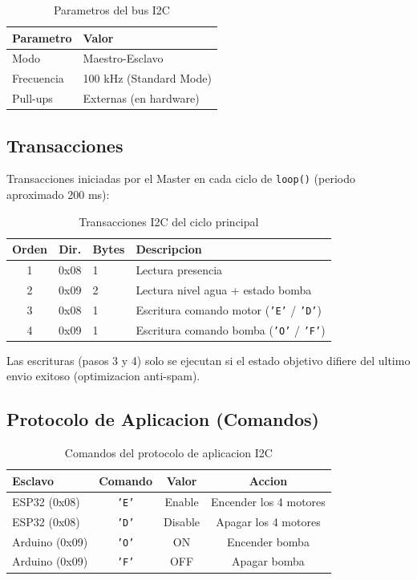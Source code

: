\begin{table}[H]
\centering
\small
\caption{Parametros del bus I2C}
\label{tab:i2c-parametros}
\begin{tabularx}{0.6\textwidth}{@{}lX@{}}
\toprule
\textbf{Parametro} & \textbf{Valor} \\
\midrule
Modo & Maestro-Esclavo \\
Frecuencia & 100 kHz (Standard Mode) \\
Pull-ups & Externas (en hardware) \\
\bottomrule
\end{tabularx}
\end{table}

\subsection{Transacciones}

Transacciones iniciadas por el Master en cada ciclo de \texttt{loop()} (periodo aproximado 200 ms):

\begin{table}[H]
\centering
\small
\caption{Transacciones I2C del ciclo principal}
\label{tab:i2c-transacciones}
\begin{tabularx}{0.85\textwidth}{@{}cclX@{}}
\toprule
\textbf{Orden} & \textbf{Dir.} & \textbf{Bytes} & \textbf{Descripcion} \\
\midrule
1 & 0x08 & 1 & Lectura presencia \\
2 & 0x09 & 2 & Lectura nivel agua + estado bomba \\
3 & 0x08 & 1 & Escritura comando motor (\texttt{'E'} / \texttt{'D'}) \\
4 & 0x09 & 1 & Escritura comando bomba (\texttt{'O'} / \texttt{'F'}) \\
\bottomrule
\end{tabularx}
\end{table}

Las escrituras (pasos 3 y 4) solo se ejecutan si el estado objetivo difiere del ultimo envio exitoso (optimizacion anti-spam).

\subsection{Protocolo de Aplicacion (Comandos)}

\begin{table}[H]
\centering
\small
\caption{Comandos del protocolo de aplicacion I2C}
\label{tab:i2c-comandos}
\begin{tabularx}{\textwidth}{@{}lccc@{}}
\toprule
\textbf{Esclavo} & \textbf{Comando} & \textbf{Valor} & \textbf{Accion} \\
\midrule
ESP32 (0x08) & \texttt{'E'} & Enable & Encender los 4 motores \\
ESP32 (0x08) & \texttt{'D'} & Disable & Apagar los 4 motores \\
Arduino (0x09) & \texttt{'O'} & ON & Encender bomba \\
Arduino (0x09) & \texttt{'F'} & OFF & Apagar bomba \\
\bottomrule
\end{tabularx}
\end{table}

